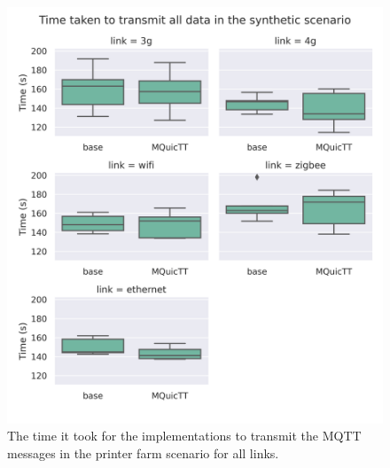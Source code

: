 \begin{figure}
    \centering
    \includegraphics[width=1\linewidth]{images/analysis_comm_time_synth.png}
    \caption{The time it took for the implementations to transmit the MQTT messages in the printer farm scenario for all links.}
    \label{fig:comm_time_synth}
\end{figure}